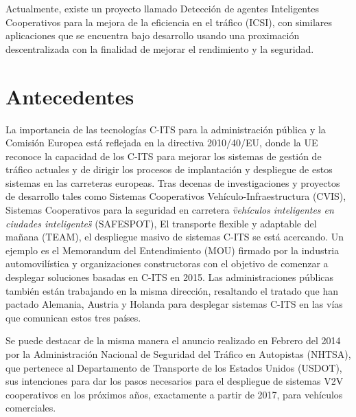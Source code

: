 Actualmente, existe un proyecto llamado Detección de agentes Inteligentes Cooperativos para la mejora de la eficiencia en el tráfico (ICSI), con similares aplicaciones que se encuentra bajo desarrollo usando una proximación descentralizada con la finalidad de mejorar el rendimiento y la seguridad.

\section{Antecedentes}\label{section:antecedentes}
La importancia de las tecnologías C-ITS para la administración pública y la Comisión Europea está reflejada en la directiva 2010/40/EU, donde la UE reconoce la capacidad de los C-ITS para mejorar los sistemas de gestión de tráfico actuales y de dirigir los procesos de implantación y despliegue de estos sistemas en las carreteras europeas. Tras decenas de investigaciones y proyectos de desarrollo tales como Sistemas Cooperativos Vehículo-Infraestructura (CVIS), Sistemas Cooperativos para la seguridad en carretera \emph{\"vehículos inteligentes en ciudades inteligentes\"} (SAFESPOT), El transporte flexible y adaptable del mañana (TEAM), el despliegue masivo de sistemas C-ITS se está acercando. Un ejemplo es el Memorandum del Entendimiento (MOU) firmado por la industria automovilística y organizaciones constructoras con el objetivo de comenzar a desplegar soluciones basadas en C-ITS en 2015. Las administraciones públicas también están trabajando en la misma dirección, resaltando el tratado que han pactado Alemania, Austria y Holanda para desplegar sistemas C-ITS en las vías que comunican estos tres países.

Se puede destacar de la misma manera el anuncio realizado en Febrero del 2014 por la Administración Nacional de Seguridad del Tráfico en Autopistas (NHTSA), que pertenece al Departamento de Transporte de los Estados Unidos (USDOT), sus intenciones para dar los pasos necesarios para el despliegue de sistemas V2V cooperativos en los próximos años, exactamente a partir de 2017, para vehículos comerciales.